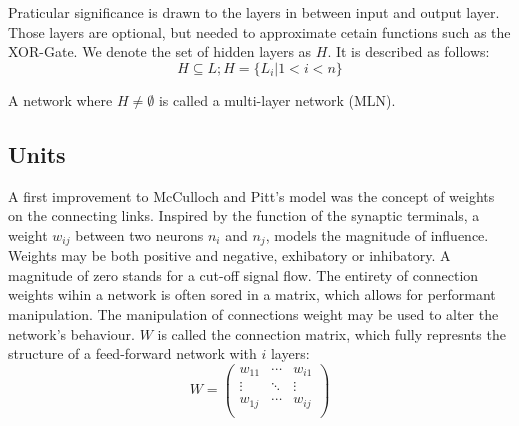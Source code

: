 \documentclass[10pt,a4paper,DIV=11]{scrreprt}
\let\oldemptyset\emptyset
\let\emptyset\varnothing
\begin{document}
\begin{figure}
\label{fig:layer}
\end{figure}

Praticular significance is drawn to the layers in between input and output layer. Those layers are optional, but needed to approximate cetain functions such as the XOR-Gate. 
We denote the set of hidden layers as $H$. It is described as follows:
\begin{equation}
H \subseteq L; H = \{L_i|1<i<n\}
\end{equation} 

A network where $H \neq \oldemptyset$ is called a multi-layer network (MLN). 

\subsection{Units}
\label{subsec:weights}

A first improvement to McCulloch and Pitt's model was the concept of weights on the connecting links. Inspired by the function of the synaptic terminals, a weight $w_{ij}$ between two neurons $n_i$ and $n_j$, models the magnitude of influence. Weights may be both positive and negative, exhibatory or inhibatory. A magnitude of zero stands for a cut-off signal flow. The entirety of connection weights wihin a network is often sored in a matrix, which allows for performant manipulation. The manipulation of connections weight may be used to alter the network's behaviour. $W$ is called the connection matrix, which fully represnts the structure of a feed-forward network with $i$ layers:
\begin{equation}
W = 
\begin{pmatrix}
w_{11} & \cdots & w_{i1} \\
\vdots & \ddots & \vdots \\
w_{1j} & \cdots & w_{ij} \\
\end{pmatrix}
\end{equation}
\end{document}

